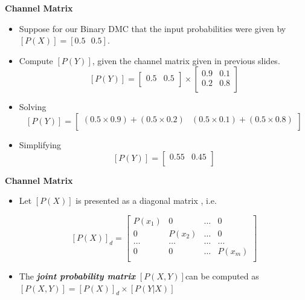 \documentclass[a4]{beamer}
\begin{document}
\noindent \textbf{Channel Matrix}
\begin{itemize}
\item Suppose for our Binary DMC that the input probabilities were given by $[P(X)] = [ 0.5\mbox{   }0.5]$.
\item Compute $[P(Y)]$, given the channel matrix given in previous slides.
\[  [P(Y)]  =  \left[ \begin{array}{cc}
0.5 & 0.5 \\
\end{array} \right] \times \left[ \begin{array}{cc}
0.9 & 0.1  \\
0.2 & 0.8 \\
\end{array} \right] \]

\item Solving
\[  [P(Y)]  =  \left[ \begin{array}{cc}
(0.5 \times 0.9)+(0.5 \times 0.2) & (0.5 \times 0.1)+(0.5 \times 0.8) \\
\end{array} \right]  \]

\item Simplifying \[  [P(Y)]  =  \left[ \begin{array}{cc}
0.55 & 0.45 \\
\end{array} \right]  \]
\end{itemize}




\noindent \textbf{Channel Matrix}
\begin{itemize}
\item Let $[P(X)]$ is presented as a diagonal matrix , i.e.

\[  [P(X)]_d  = \left[ \begin{array}{cccc}
P(x_1) &0 & \ldots & 0 \\
0 & P(x_2)& \ldots & 0 \\
\ldots & \ldots & \ldots & \ldots \\
0& 0 & \ldots & P(x_m) \\
\end{array} \right] \]
\item The \emph{\textbf{ joint probability matrix}} $[P(X,Y)]$can be computed as
$[P(X,Y)]  = [P(X)]_d\times [P(Y|X)]$
\end{itemize}
\end{document}
